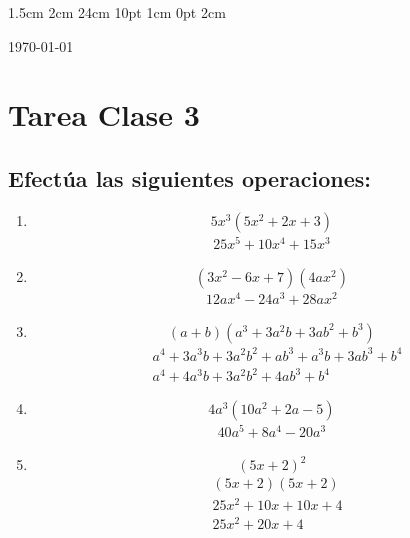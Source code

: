 \documentclass[12pt,letterpaper]{report}
\begin{document}
\setmargins{2.5cm}      
{1.5cm}                     
{2cm}  
{24cm}                    
{10pt}                          
{1cm}                          
{0pt}                             
{2cm}
\begin{flushright}
\today
\end{flushright}
\vspace{-1.75cm}
\section*{Tarea Clase 3}
\subsection*{Efectúa las siguientes operaciones:}
\begin{enumerate}
\item \begin{equation*}
5x^3(5x^2+2x+3)    
\end{equation*}
\begin{align*}
    25x^5+10x^4+15x^3
\end{align*}
\item \begin{equation*}
    (3x^2-6x+7)(4ax^2)
\end{equation*}
\begin{align*}
        12ax^4-24a^3+28ax^2
\end{align*}
\item \begin{equation*}
    (a+b)(a^3+3a^2b+3ab^2+b^3)
\end{equation*}
\begin{align*}
        &a^4+3a^3b+3a^2b^2+ab^3+a^3b+3ab^3+b^4\\
        &a^4+4a^3b+3a^2b^2+4ab^3+b^4
\end{align*}
\item \begin{equation*}
    4a^3(10a^2+2a-5)
\end{equation*}
\begin{align*}
    40a^5+8a^4-20a^3
\end{align*}
\item \begin{equation*}
    (5x+2)^2
\end{equation*}
\begin{align*}
    &(5x+2)(5x+2)\\
    &25x^2+10x+10x+4\\
    &25x^2+20x+4
\end{align*}

\end{enumerate}
\end{document}
